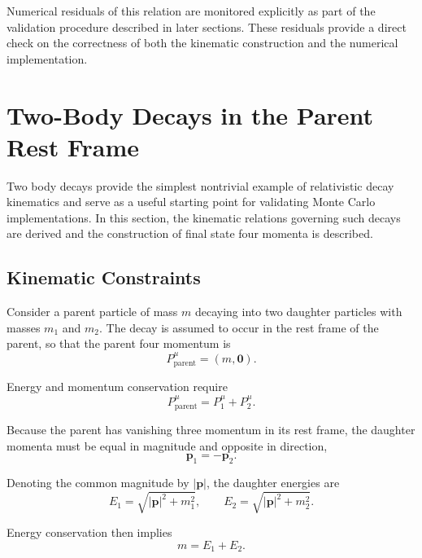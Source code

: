 \documentclass[11pt,a4paper]{article}
\newcommand{\p}{\mathbf{p}}
\begin{document}
Numerical residuals of this relation are monitored explicitly as part of the validation
procedure described in later sections. These residuals provide a direct check on the
correctness of both the kinematic construction and the numerical implementation.


\section{Two-Body Decays in the Parent Rest Frame}
\label{sec:two_body}

Two body decays provide the simplest nontrivial example of relativistic decay
kinematics and serve as a useful starting point for validating Monte Carlo
implementations. In this section, the kinematic relations governing such decays
are derived and the construction of final state four momenta is described.

\subsection{Kinematic Constraints}

Consider a parent particle of mass $m$ decaying into two daughter particles with
masses $m_1$ and $m_2$. The decay is assumed to occur in the rest frame of the
parent, so that the parent four momentum is
\begin{equation}
P_{\text{parent}}^\mu = (m, \mathbf{0}) .
\end{equation}

Energy and momentum conservation require
\begin{equation}
P_{\text{parent}}^\mu = P_1^\mu + P_2^\mu .
\end{equation}

Because the parent has vanishing three momentum in its rest frame, the daughter
momenta must be equal in magnitude and opposite in direction,
\begin{equation}
\p_1 = - \p_2 .
\end{equation}

Denoting the common magnitude by $|\p|$, the daughter energies are
\begin{equation}
E_1 = \sqrt{|\p|^2 + m_1^2}, \qquad
E_2 = \sqrt{|\p|^2 + m_2^2}.
\end{equation}

Energy conservation then implies
\begin{equation}
m = E_1 + E_2 .
\end{equation}
\end{document}
